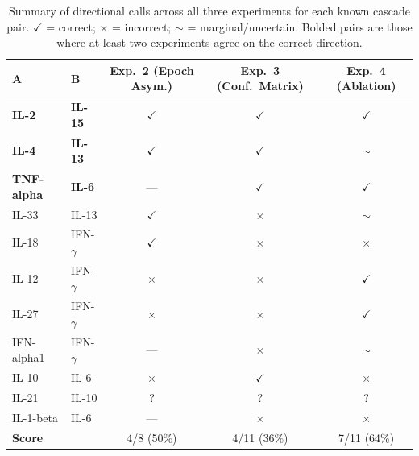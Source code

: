 \documentclass[11pt,a4paper]{article}
\begin{document}
\begin{table}[H]
\centering
\caption{%
    Summary of directional calls across all three experiments for each
    known cascade pair. \textcolor{correct}{$\checkmark$} = correct;
    \textcolor{wrong}{$\times$} = incorrect; \textcolor{marginal}{$\sim$} = marginal/uncertain.
    Bolded pairs are those where at least two experiments agree on the correct direction.
}
\begin{tabular}{ll ccc}
\toprule
\textbf{A} & \textbf{B} &
\textbf{Exp.\ 2 (Epoch Asym.)} &
\textbf{Exp.\ 3 (Conf.\ Matrix)} &
\textbf{Exp.\ 4 (Ablation)} \\
\midrule
\textbf{IL-2}      & \textbf{IL-15}       & \textcolor{correct}{$\checkmark$} & \textcolor{correct}{$\checkmark$} & \textcolor{correct}{$\checkmark$} \\
\textbf{IL-4}      & \textbf{IL-13}       & \textcolor{correct}{$\checkmark$} & \textcolor{correct}{$\checkmark$} & \textcolor{marginal}{$\sim$} \\
\textbf{TNF-alpha} & \textbf{IL-6}        & ---       & \textcolor{correct}{$\checkmark$} & \textcolor{correct}{$\checkmark$} \\
IL-33      & IL-13        & \textcolor{correct}{$\checkmark$} & \textcolor{wrong}{$\times$}  & \textcolor{marginal}{$\sim$} \\
IL-18      & IFN-$\gamma$ & \textcolor{correct}{$\checkmark$} & \textcolor{wrong}{$\times$}  & \textcolor{wrong}{$\times$} \\
IL-12      & IFN-$\gamma$ & \textcolor{wrong}{$\times$}  & \textcolor{wrong}{$\times$}  & \textcolor{correct}{$\checkmark$} \\
IL-27      & IFN-$\gamma$ & \textcolor{wrong}{$\times$}  & \textcolor{wrong}{$\times$}  & \textcolor{correct}{$\checkmark$} \\
IFN-alpha1 & IFN-$\gamma$ & ---       & \textcolor{wrong}{$\times$}  & \textcolor{marginal}{$\sim$} \\
IL-10      & IL-6         & \textcolor{wrong}{$\times$}  & \textcolor{correct}{$\checkmark$} & \textcolor{wrong}{$\times$} \\
IL-21      & IL-10        & \textcolor{marginal}{?}       & \textcolor{marginal}{?}       & \textcolor{marginal}{?} \\
IL-1-beta  & IL-6         & ---       & \textcolor{wrong}{$\times$}  & \textcolor{wrong}{$\times$} \\
\midrule
\textbf{Score} & & 4/8 (50\%) & 4/11 (36\%) & 7/11 (64\%) \\
\bottomrule
\end{tabular}
\end{table}
\end{document}
